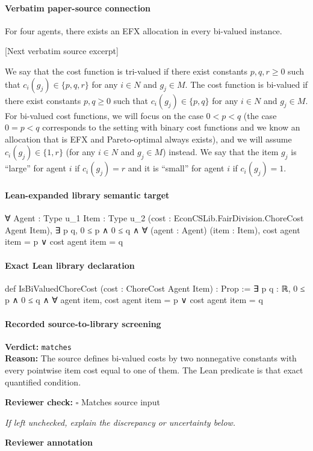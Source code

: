 \documentclass[10pt]{article}
\newcommand{\reviewerbox}{%
  \par\noindent\fbox{\parbox{0.96\linewidth}{\rule{0pt}{0.38in}}}\par
}
\newcommand{\reviewmatch}[1]{%
  \par\noindent\textbf{Reviewer check:} $\square$\; #1\par
  \noindent\emph{If left unchecked, explain the discrepancy or uncertainty below.}\par
}
\begin{document}
\paragraph{Verbatim paper-source connection}
\begin{ReviewVerbatim}
\begin{theorem}\label{thm:four}
    For four agents, there exists an EFX allocation in every bi-valued instance.
\end{theorem}

[Next verbatim source excerpt]

We say that the cost function is tri-valued if there exist constants $p,q,r\geq 0$ such that $c_i(g_j)\in\{p,q,r\}$ for any $i\in N$ and $g_j\in M$.
The cost function is bi-valued if there exist constants $p,q\geq 0$ such that $c_i(g_j)\in\{p,q\}$ for any $i\in N$ and $g_j\in M$.
For bi-valued cost functions, we will focus on the case $0<p<q$ (the case $0=p<q$ corresponds to the setting with binary cost functions and we know an allocation that is EFX and Pareto-optimal always exists), and we will assume $c_i(g_j)\in\{1,r\}$ (for any $i\in N$ and $g_j\in M$) instead.
We say that the item $g_j$ is ``large'' for agent $i$ if $c_i(g_j)=r$ and it is ``small'' for agent $i$ if $c_i(g_j)=1$.
\end{ReviewVerbatim}

\paragraph{Lean-expanded library semantic target}
\begin{ReviewVerbatim}
∀ {Agent : Type u_1} {Item : Type u_2} (cost : EconCSLib.FairDivision.ChoreCost Agent Item),
  ∃ p q, 0 ≤ p ∧ 0 ≤ q ∧ ∀ (agent : Agent) (item : Item), cost agent item = p ∨ cost agent item = q
\end{ReviewVerbatim}

\paragraph{Exact Lean library declaration}
\begin{ReviewVerbatim}
def IsBiValuedChoreCost (cost : ChoreCost Agent Item) : Prop :=
  ∃ p q : ℝ, 0 ≤ p ∧ 0 ≤ q ∧
    ∀ agent item, cost agent item = p ∨ cost agent item = q
\end{ReviewVerbatim}

\paragraph{Recorded source-to-library screening}
\textbf{Verdict:} \texttt{matches}
\\
\textbf{Reason:} The source defines bi-valued costs by two nonnegative constants with every pointwise item cost equal to one of them. The Lean predicate is that exact quantified condition.
\reviewmatch{Matches source input}
\noindent\textbf{Reviewer annotation}\par
\reviewerbox
\clearpage
\hypertarget{library-prerequisite-d5b3a13495d92097}{}
\end{document}

